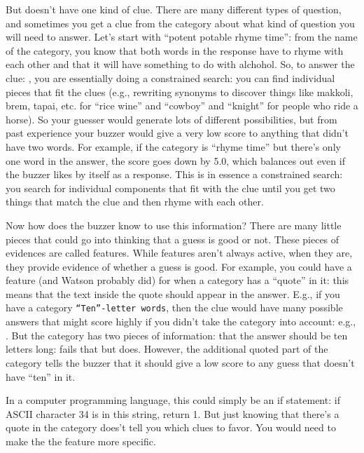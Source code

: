 But \jeopardy{} doesn’t have one kind of clue.  There are many different types
of question, and sometimes you get a clue from the category about what kind of
question you will need to answer.  Let’s start with ``potent potable rhyme
time'': from the name of the category, you know that both words in the
response have to rhyme with each other and that it will have something to do
with alchohol.
%
So, to answer the clue:
,
%
you are essentially doing a constrained search: you can find individual pieces
that fit the clues (e.g., rewriting synonyms to discover things like makkoli,
brem, tapai, etc. for ``rice wine'' and ``cowboy'' and ``knight'' for people
who ride a horse).
%
So your guesser would generate lots of different possibilities, but from past
experience your buzzer would give a very low score to anything that didn't
have two words.
%
For example, if the category is ``rhyme time'' but there's only one word in
the answer, the score goes down by 5.0, which balances out even if the buzzer
likes  by itself as a response.
%
This is in essence a
constrained search: you search for individual components that fit with the
clue until you get two things that match the clue and then rhyme with each
other.

Now how does the buzzer know to use this information?
%
There are many little pieces that could go into thinking that a guess is good
or not.  These pieces of evidences are called features.
%
While features aren’t
always active, when they are, they provide evidence of whether a guess is
good.
%
For example, you could have a feature (and Watson probably did) for
when a category has a ``quote'' in it: this means that the text inside the
quote should appear in the answer.
%
E.g., if you have a category \texttt{``Ten''-letter words}, then the clue
would have many possible answers that might score highly if you didn't take
the category into account: e.g., .
%
But the category has two pieces of information: that the answer should be ten
letters long:  fails that but  does.
%
However, the additional quoted part of the category tells the buzzer that it
should give a low score to any guess that doesn't have ``ten'' in it.

In a computer programming language, this could simply be an if statement: if
ASCII character 34 is in this string, return 1.  But just knowing that there’s
a quote in the category does’t tell you which clues to favor.  You would need
to make the the feature more specific.


